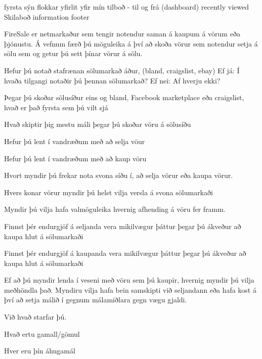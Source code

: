 fyrsta sýn
    flokkar
    yfirlit yfir mín tilboð - til og frá (dashboard)
    recently viewed
    Skilaboð
information footer

FireSale er netmarkaður sem tengir notendur saman á kaupum á vörum eða þjónustu. Á vefnum færð þú möguleika á því að skoða vörur sem notendur setja á sölu sem og getur þú sett þínar vörur á sölu. 

Hefur þú notað stafrænan sölumarkað áður, (bland, craigslist, ebay) 
Ef já:
    Í hvaða tilgangi notaðir þú þennan sölumarkað?
Ef nei:
    Af hverju ekki?

Þegar þú skoðar sölusíður eins og bland, Facebook marketplace eða craigslist, hvað er það fyrsta sem þú vilt sjá

Hvað skiptir þig mestu máli þegar þú skoðar vöru á sölusíðu

Hefur þú lent í vandræðum með að selja vöur

Hefur þú lent í vandræðum með að kaup vöru

Hvort myndir þú frekar nota svona síðu í, að selja vörur eða kaupa vörur.

Hvers konar vörur myndir þú helst vilja versla á svona sölumarkaði 

Myndir þú vilja hafa valmöguleika hvernig afhending á vöru fer framm.

Finnst þér endurgjöf á seljanda vera mikilvægur þáttur þegar þú ákveður að kaupa hlut á sölumarkaði

Finnst þér endurgjöf á kaupanda vera mikilvægur þáttur þegar þú ákveður að kaupa hlut á sölumarkaði

Ef að þú myndir lenda í veseni með vöru sem þú kaupir, hvernig myndir þú vilja meðhöndla það. Myndiru vilja hafa bein samskipti við seljandann eða hafa kost á því að setja málið í gegnum málamiðlara gegn vægu gjaldi.

Við hvað starfar þú.

Hvað ertu gamall/gömul

Hver eru þín áhugamál 